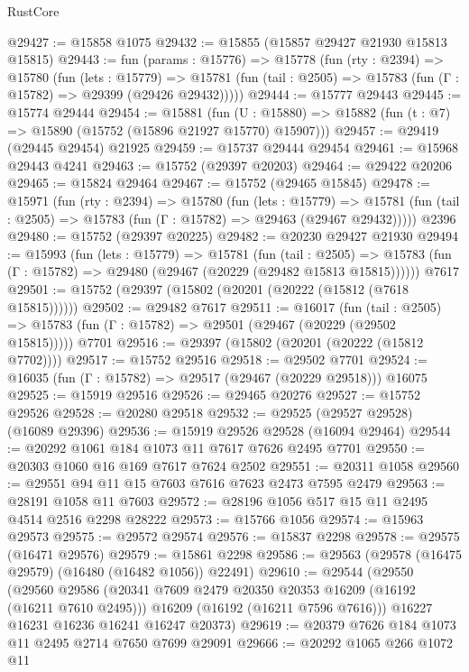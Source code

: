 \begin{lexlean}{RustCore}
\begin{coremodule}
@29427 := @15858 @1075
@29432 := @15855 (@15857 @29427 @21930 @15813 @15815)
@29443 := fun (params : @15776) =>
  @15778
    (fun (rty : @2394) =>
    @15780
      (fun (lets : @15779) =>
      @15781 (fun (tail : @2505) => @15783 (fun (Γ : @15782) => @29399 (@29426 @29432)))))
@29444 := @15777 @29443
@29445 := @15774 @29444
@29454 := @15881
    (fun (U : @15880) => @15882 (fun (t : @7) => @15890 (@15752 (@15896 @21927 @15770) @15907)))
@29457 := @29419 (@29445 @29454) @21925
@29459 := @15737 @29444 @29454
@29461 := @15968 @29443 @4241
@29463 := @15752 (@29397 @20203)
@29464 := @29422 @20206
@29465 := @15824 @29464
@29467 := @15752 (@29465 @15845)
@29478 := @15971
    (fun (rty : @2394) =>
    @15780
      (fun (lets : @15779) =>
      @15781 (fun (tail : @2505) => @15783 (fun (Γ : @15782) => @29463 (@29467 @29432)))))
    @2396
@29480 := @15752 (@29397 @20225)
@29482 := @20230 @29427 @21930
@29494 := @15993
    (fun (lets : @15779) =>
    @15781
      (fun (tail : @2505) =>
      @15783 (fun (Γ : @15782) => @29480 (@29467 (@20229 (@29482 @15813 @15815))))))
    @7617
@29501 := @15752 (@29397 (@15802 (@20201 (@20222 (@15812 (@7618 @15815))))))
@29502 := @29482 @7617
@29511 := @16017
    (fun (tail : @2505) => @15783 (fun (Γ : @15782) => @29501 (@29467 (@20229 (@29502 @15815)))))
    @7701
@29516 := @29397 (@15802 (@20201 (@20222 (@15812 @7702))))
@29517 := @15752 @29516
@29518 := @29502 @7701
@29524 := @16035 (fun (Γ : @15782) => @29517 (@29467 (@20229 @29518))) @16075
@29525 := @15919 @29516
@29526 := @29465 @20276
@29527 := @15752 @29526
@29528 := @20280 @29518
@29532 := @29525 (@29527 @29528) (@16089 @29396)
@29536 := @15919 @29526 @29528 (@16094 @29464)
@29544 := @20292 @1061 @184 @1073 @11 @7617 @7626 @2495 @7701
@29550 := @20303 @1060 @16 @169 @7617 @7624 @2502
@29551 := @20311 @1058
@29560 := @29551 @94 @11 @15 @7603 @7616 @7623 @2473 @7595 @2479
@29563 := @28191 @1058 @11 @7603
@29572 := @28196 @1056 @517 @15 @11 @2495 @4514 @2516 @2298 @28222
@29573 := @15766 @1056
@29574 := @15963 @29573
@29575 := @29572 @29574
@29576 := @15837 @2298
@29578 := @29575 (@16471 @29576)
@29579 := @15861 @2298
@29586 := @29563 (@29578 (@16475 @29579) (@16480 (@16482 @1056)) @22491)
@29610 := @29544
    (@29550
      (@29560
        @29586
        (@20341 @7609 @2479 @20350 @20353 @16209 (@16192 (@16211 @7610 @2495)))
        @16209
        (@16192 (@16211 @7596 @7616)))
      @16227
      @16231
      @16236
      @16241
      @16247
      @20373)
@29619 := @20379 @7626 @184 @1073 @11 @2495 @2714 @7650 @7699 @29091
@29666 := @20292
    @1065
    @266
    @1072
    @11

\end{coremodule}
\end{lexlean}
